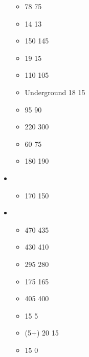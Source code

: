 \begin{itemize}
\begin{itemize}
		\item \shabtis{} \extramodel{} 78 \costdown{} 75
		\item \shabtis{} \pw{} 14 \costdown{} 13
		\item \greatvultures{} \basecost{} 150 \costdown{} 145
		\item \greatvultures{} \extramodel{} 19 \costdown{} 15
		\item \scarabswarms{} \basecost{} 110 \costdown{} 105
		\item \scarabswarms{} Underground \ambush{} 18 \costdown{} 15
		\item \shabtiarchers{} \extramodel{} 95 \costdown{} 90
		\item \sandstalkers{} \basecost{} 220 \costup{} 300
		\item \sandstalkers{} \extramodel{} 60 \costup{} 75
		\item \charnelcatapult{} \basecost{} 180 \costup{} 190
	\end{itemize}
	\item \entombed
	\begin{itemize}
		\item \sandscorpion{} \basecost{} 170 \costdown{} 150
	\end{itemize}
	\item \masonsmenagerie
	\begin{itemize}
		\item \battlesphinx{} \basecost{} 470 \costdown{} 435
		\item \dreadsphinx{} \basecost{} 430 \costdown{} 410
		\item \tombreapers{} \basecost{} 295 \costdown{} 280
		\item \tombreapers{} \extramodel{} 175 \costdown{} 165
		\item \colossus{} \basecost{} 405 \costdown{} 400
		\item \colossus{} \gw{} 15 \costdown{} 5
		\item \colossus{} \giantaspenbow{} (5+) 20 \costdown{} 15
		\item \colossus{} \scalesofdestiny{} 15 \costdown{} 0
	\end{itemize}
\end{itemize}